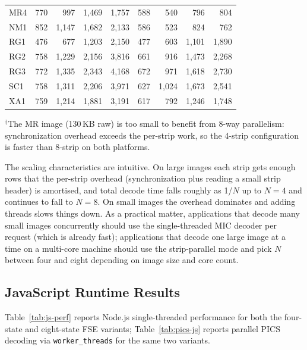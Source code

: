 \documentclass[journal]{IEEEtran}
\begin{document}
\begin{table}[htbp]
\begin{tabular}{l|rrrr|rrrr}
MR4  & 770   & 997   & 1{,}469 & 1{,}757           & 588   & 540     & 796     & 804 \\
NM1  & 852   & 1{,}147 & 1{,}682 & 2{,}133         & 586   & 523     & 824     & 762 \\
RG1  & 476   & 677   & 1{,}203 & 2{,}150           & 477   & 603     & 1{,}101 & 1{,}890 \\
RG2  & 758   & 1{,}229 & 2{,}156 & 3{,}816         & 661   & 916     & 1{,}473 & 2{,}268 \\
RG3  & 772   & 1{,}335 & 2{,}343 & 4{,}168         & 672   & 971     & 1{,}618 & 2{,}730 \\
SC1  & 758   & 1{,}311 & 2{,}206 & 3{,}971         & 627   & 1{,}024 & 1{,}673 & 2{,}541 \\
XA1  & 759   & 1{,}214 & 1{,}881 & 3{,}191         & 617   & 792     & 1{,}246 & 1{,}748 \\
\bottomrule
\end{tabular}
\end{table}

\noindent $^\dagger$The MR image (130\,KB raw) is too small to benefit from
8-way parallelism: synchronization overhead exceeds the per-strip work, so
the 4-strip configuration is faster than 8-strip on both platforms.

The scaling characteristics are intuitive. On large images each strip
gets enough rows that the per-strip overhead (synchronization plus
reading a small strip header) is amortised, and total decode time falls
roughly as 1/$N$ up to $N=4$ and continues to fall to $N=8$. On small
images the overhead dominates and adding threads slows things down. As
a practical matter, applications that decode many small images
concurrently should use the single-threaded MIC decoder per request
(which is already fast); applications that decode one large image at a
time on a multi-core machine should use the strip-parallel mode and pick
$N$ between four and eight depending on image size and core count.

\subsection{JavaScript Runtime Results}
\label{subsec:js-state-effect}

Table~\ref{tab:js-perf} reports Node.js single-threaded performance for
both the four-state and eight-state FSE variants;
Table~\ref{tab:pics-js} reports parallel PICS decoding via
\texttt{worker\_threads} for the same two variants.
\end{document}
